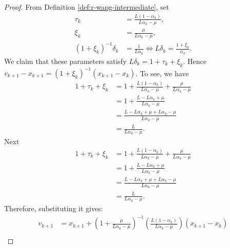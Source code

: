 \documentclass[12pt]{article}
\begin{document}
        \begin{proof}
            From Definition \ref{def:r-wapg-intermediate}, set 
            \begin{align*}
                \tau_k &= \frac{L(1 - \alpha_k)}{L\alpha_k - \mu}, 
                \\
                \xi_k &= \frac{\mu}{L \alpha_k - \mu},
                \\
                (1 + \xi_k)^{-1}\delta_k &= \frac{1}{L\alpha_k}
                \iff L \delta_k = \frac{1 + \xi_k}{\alpha_k}. 
            \end{align*}
            We claim that these parameters satisfy $L\delta_k = 1 + \tau_k + \xi_k$. 
            Hence $v_{k + 1} - x_{k + 1} = (1 + \xi_k)^{-1}(x_{k + 1} - x_k)$. 
            To see, we have 
            \begin{align*}
                1 + \tau_k + \xi_k &= 
                1 + \frac{L(1 - \alpha_k)}{L \alpha_k - \mu} 
                + \frac{\mu}{L \alpha_k - \mu}
                \\
                &= 
                1 + \frac{L - L \alpha_k + \mu}{L\alpha_k - \mu}
                \\
                &= 
                \frac{L - L \alpha_k + \mu + L \alpha_k - \mu}{L\alpha_k - \mu}
                \\
                &= \frac{L}{L\alpha_k - \mu}. 
            \end{align*}
            Next
            \begin{align*}
                1 + \tau_k + \xi_k &= 
                1 + \frac{L(1 - \alpha_k)}{L \alpha_k - \mu} 
                + \frac{\mu}{L \alpha_k - \mu}
                \\
                &= 
                1 + \frac{L - L \alpha_k + \mu}{L\alpha_k - \mu}
                \\
                &= 
                \frac{L - L \alpha_k + \mu + L \alpha_k - \mu}{L\alpha_k - \mu}
                \\
                &= \frac{L}{L\alpha_k - \mu}. 
            \end{align*}
            Therefore, substituting it gives: 
            \begin{align*}
                v_{k + 1} &= 
                x_{k + 1} + \left(
                    1 + \frac{\mu}{L\alpha_k - \mu}
                \right)^{-1}\left(
                    \frac{L(1 - \alpha_k)}{L\alpha_k - \mu}
                \right)(x_{k + 1} - x_k)
                \\

\end{align*}
\end{proof}
\end{document}
